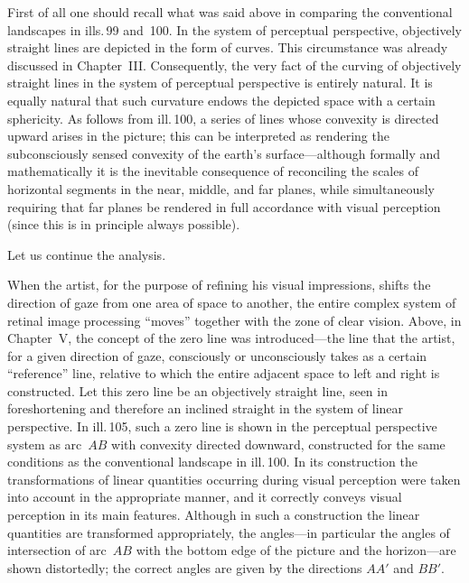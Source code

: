 


First of all one should recall what was said above in comparing the conventional
landscapes in ills.\,99 and~100. In the system of perceptual perspective, objectively
straight lines are depicted in the form of curves. This circumstance was already
discussed in Chapter~III. Consequently, the very fact of the curving of objectively
straight lines in the system of perceptual perspective is entirely natural. It is
equally natural that such curvature endows the depicted space with a certain
sphericity. As follows from ill.\,100, a series of lines whose convexity is directed
upward arises in the picture; this can be interpreted as rendering the subconsciously
sensed convexity of the earth's surface---although formally and mathematically it is
the inevitable consequence of reconciling the scales of horizontal segments in the
near, middle, and far planes, while simultaneously requiring that far planes be
rendered in full accordance with visual perception (since this is in principle always
possible).

Let us continue the analysis.

When the artist, for the purpose of refining his visual impressions, shifts the
direction of gaze from one area of space to another, the entire complex system of
retinal image processing ``moves'' together with the zone of clear vision. Above, in
Chapter~V, the concept of the zero line was introduced---the line that the artist,
for a given direction of gaze, consciously or unconsciously takes as a certain
``reference'' line, relative to which the entire adjacent space to left and right is
constructed. Let this zero line be an objectively straight line, seen in
foreshortening and therefore an inclined straight in the system of linear perspective.
In ill.\,105, such a zero line is shown in the perceptual perspective system as arc~$AB$
with convexity directed downward, constructed for the same conditions as the
conventional landscape in ill.\,100. In its construction the transformations of
linear quantities occurring during visual perception were taken into account in the
appropriate manner, and it correctly conveys visual perception in its main features.
Although in such a construction the linear quantities are transformed appropriately,
the angles---in particular the angles of intersection of arc~$AB$ with the bottom
edge of the picture and the horizon---are shown distortedly; the correct angles are
given by the directions $AA'$ and $BB'$.

